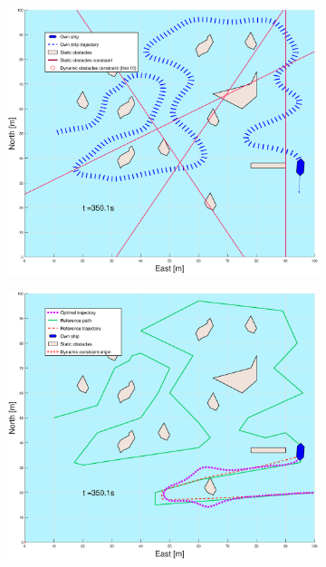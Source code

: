 \begin{figure}[ht]
\begin{subfigure}[b]{0.499\textwidth}
    \end{subfigure}
    \hfill
    \\
    \begin{subfigure}[b]{0.49\textwidth}
        \centering
        \includegraphics[width=\textwidth]{Images/Figures/skjergard_u_trafikk/_Simple_1fig1_time=350}
    \end{subfigure}
    \hfill
    \begin{subfigure}[b]{0.499\textwidth}
        \centering
        \includegraphics[width=\textwidth]{Images/Figures/skjergard_u_trafikk/_Simple_1fig999_time=350}

\end{subfigure}
\end{figure}
